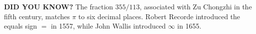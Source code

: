 \begin{tcolorbox}[
  colback=SoftYellow,
  colframe=IEEEorange!75!black,
  boxrule=0.6pt,
  arc=0mm,
  left=3mm,right=3mm,top=2mm,bottom=2mm
]
\small
{\sffamily\bfseries\color{IEEEorange!75!black}DID YOU KNOW?}\quad
The fraction $355/113$, associated with Zu Chongzhi in the fifth century, matches $\pi$ to six decimal places. Robert Recorde introduced the equals sign $=$ in 1557, while John Wallis introduced $\infty$ in 1655.
\end{tcolorbox}